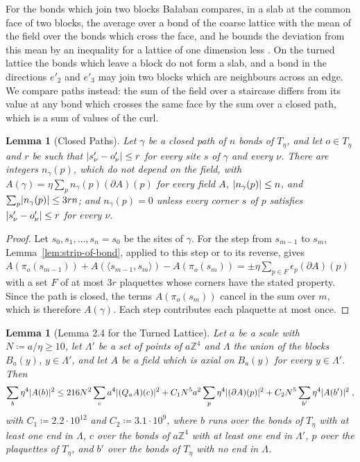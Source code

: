 \documentclass[11pt]{preprint}
\DeclarePairedDelimiter{\abs}{\lvert}{\rvert}
\numberwithin{equation}{section}
\newtheorem{lemma}[theorem]{Lemma}
\theoremstyle{definition}
\theoremstyle{remark}
\theoremstyle{plain}
\begin{document}
For the bonds which join two blocks Ba{\l}aban compares, in a slab at the common face of two blocks, the average over a bond of the coarse lattice with the mean of the field over the bonds which cross the face, and he bounds the deviation from this mean by an inequality for a lattice of one dimension less \cite[(2.124)--(2.127), p.~245]{BalabanPRT2}. On the turned lattice the bonds which leave a block do not form a slab, and a bond in the directions $e'_2$ and $e'_3$ may join two blocks which are neighbours across an edge. We compare paths instead: the sum of the field over a staircase differs from its value at any bond which crosses the same face by the sum over a closed path, which is a sum of values of the curl.

\begin{lemma}[Closed Paths]\label{lem:closed-paths}
Let $\gamma$ be a closed path of $n$ bonds of $T_\eta$, and let $o \in T_\eta$ and $r$ be such that $\abs{s'_\nu - o'_\nu} \leq r$ for every site $s$ of $\gamma$ and every $\nu$. There are integers $n_\gamma(p)$, which do not depend on the field, with $A(\gamma) = \eta\sum_pn_\gamma(p)(\partial A)(p)$ for every field $A$, $\abs{n_\gamma(p)} \leq n$, and $\sum_p\abs{n_\gamma(p)} \leq 3rn$; and $n_\gamma(p) = 0$ unless every corner $s$ of $p$ satisfies $\abs{s'_\nu - o'_\nu} \leq r$ for every $\nu$.
\end{lemma}

\begin{proof}
Let $s_0, s_1, \dots, s_n = s_0$ be the sites of $\gamma$. For the step from $s_{m-1}$ to $s_m$, Lemma~\ref{lem:strip-of-bond}, applied to this step or to its reverse, gives $A(\pi_o(s_{m-1})) + A(\langle s_{m-1}, s_m\rangle) - A(\pi_o(s_m)) = \pm\eta\sum_{p \in F}\epsilon_p(\partial A)(p)$ with a set $F$ of at most $3r$ plaquettes whose corners have the stated property. Since the path is closed, the terms $A(\pi_o(s_m))$ cancel in the sum over $m$, which is therefore $A(\gamma)$. Each step contributes each plaquette at most once.
\end{proof}

\begin{lemma}[Lemma 2.4 for the Turned Lattice]\label{lem:axial-lattice}
Let $a$ be a scale with $N \coloneqq a/\eta \geq 10$, let $\Lambda'$ be a set of points of $a\mathbb Z^4$ and $\Lambda$ the union of the blocks $B_a(y)$, $y \in \Lambda'$, and let $A$ be a field which is axial on $B_a(y)$ for every $y \in \Lambda'$. Then
\begin{equation}\label{eq:axial-lattice}
    \sum_{b}\eta^4\abs{A(b)}^2 \leq 216N^2\sum_{c}a^4\abs{(Q_aA)(c)}^2 + C_1N^5a^2\sum_p\eta^4\abs{(\partial A)(p)}^2 + C_2N^5\sum_{b'}\eta^4\abs{A(b')}^2\;,
\end{equation}
with $C_1 \coloneqq 2.2 \cdot 10^{12}$ and $C_2 \coloneqq 3.1 \cdot 10^9$, where $b$ runs over the bonds of $T_\eta$ with at least one end in $\Lambda$, $c$ over the bonds of $a\mathbb Z^4$ with at least one end in $\Lambda'$, $p$ over the plaquettes of $T_\eta$, and $b'$ over the bonds of $T_\eta$ with no end in $\Lambda$.
\end{lemma}
\end{document}
